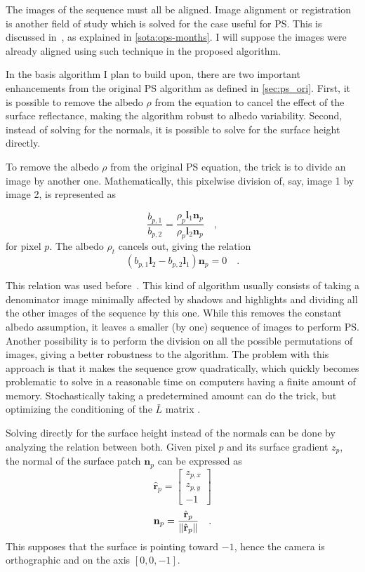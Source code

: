 The images of the sequence must all be aligned. Image alignment or registration is another field of study which is solved for the case useful for PS. This is discussed in~\cite{ackermann-cvpr-12}, as explained in \ref{sota:ops-months}. I will suppose the images were already aligned using such technique in the proposed algorithm.

In the basis algorithm I plan to build upon, there are two important enhancements from the original PS algorithm as defined in \ref{sec:ps_ori}. First, it is possible to remove the albedo $\rho$ from the equation to cancel the effect of the surface reflectance, making the algorithm robust to albedo variability. Second, instead of solving for the normals, it is possible to solve for the surface height directly. 

To remove the albedo $\rho$ from the original PS equation, the trick is to divide an image by another one. Mathematically, this pixelwise division of, say, image 1 by image 2, is represented as

\begin{equation}
\frac{b_{p,1}}{b_{p,2}} = \frac{\rho_p \mathbf{l}_1 \mathbf{n}_p}{\rho_p \mathbf{l}_2 \mathbf{n}_p} \quad,
\end{equation}
for pixel $p$. The albedo $\rho_t$ cancels out, giving the relation
\begin{equation}
\label{eq:ratio_images}
\left( b_{p,1} \mathbf{l}_2 - b_{p,2} \mathbf{l}_1 \right) \mathbf{n}_p = 0  \quad.
\end{equation}

This relation was used before~\cite{yu-iccp-13,wu-pami-06}. This kind of algorithm usually consists of taking a denominator image minimally affected by shadows and highlights and dividing all the other images of the sequence by this one. While this removes the constant albedo assumption, it leaves a smaller (by one) sequence of images to perform PS. Another possibility is to perform the division on all the possible permutations of images, giving a better robustness to the algorithm. The problem with this approach is that it makes the sequence grow quadratically, which quickly becomes problematic to solve in a reasonable time on computers having a finite amount of memory. Stochastically taking a predetermined amount can do the trick, but optimizing the conditioning of the $\bar{L}$ matrix .
 
Solving directly for the surface height instead of the normals can be done by analyzing the relation between both. Given pixel $p$ and its surface gradient $z_p$, the normal of the surface patch $\mathbf{n}_p$ can be expressed as
\begin{equation}
\hat{\mathbf{r}}_p = 
\begin{bmatrix}
z_{p,x} \\
z_{p,y} \\
-1
\end{bmatrix}
\end{equation}
\begin{equation}
\mathbf{n}_p =
\frac{\hat{\mathbf{r}}_p}{\left\lVert\hat{\mathbf{r}}_p\right\rVert} \quad.
\end{equation}
This supposes that the surface is pointing toward $-1$, hence the camera is orthographic and on the axis $[0, 0, -1]$.


